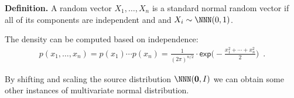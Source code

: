 \documentclass[landscape,footrule]{foils}
\renewcommand{\vec}[1]{\boldsymbol{#1}}
\begin{document}
\titlefoil




\vspace*{-1.0cm}

\textbf{Definition.} A random vector $X_1,\ldots, X_n$ is a standard normal random vector if all of its components are independent and and $X_i\sim \NNN(0,1)$.
\begin{triangles}
\item The density can be computed based on independence:
\begin{align*}
p(x_1,\ldots,x_n)=p(x_1)\cdots p(x_n)=\frac{1}{(2\pi)^{n/2}}\cdot\mathsf{exp}\Biggl(-\frac{x_1^2+\cdots+x_n^2}{2}\Biggl)\enspace.
\end{align*}
\end{triangles}


By shifting and scaling the source distribution $\NNN(\vec{0},I)$ we can obtain some other instances of multivariate normal distribution.
\vspace*{-1cm}
\end{document}
